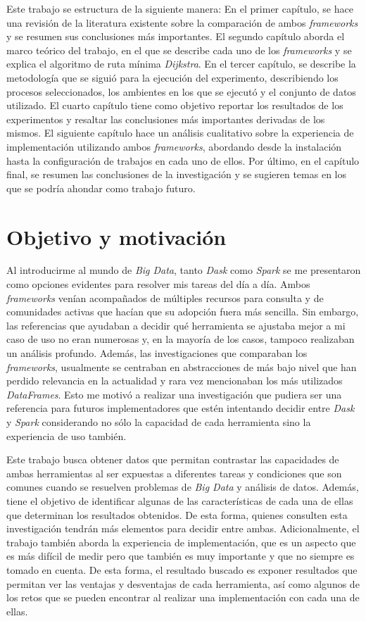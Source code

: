 Este trabajo se estructura de la siguiente manera: En el primer capítulo, se hace una revisión de la literatura existente sobre la comparación de ambos \textit{frameworks} y se resumen sus conclusiones más importantes. El segundo capítulo aborda el marco teórico del trabajo, en el que se describe cada uno de los \textit{frameworks} y se explica el algoritmo de ruta mínima \textit{Dijkstra}. En el tercer capítulo, se describe la metodología que se siguió para la ejecución del experimento, describiendo los procesos seleccionados, los ambientes en los que se ejecutó y el conjunto de datos utilizado. El cuarto capítulo tiene como objetivo reportar los resultados de los experimentos y resaltar las conclusiones más importantes derivadas de los mismos. El siguiente capítulo hace un análisis cualitativo sobre la experiencia de implementación utilizando ambos \textit{frameworks}, abordando desde la instalación hasta la configuración de trabajos en cada uno de ellos. Por último, en el capítulo final, se resumen las conclusiones de la investigación y se sugieren temas en los que se podría ahondar como trabajo futuro.

\section*{Objetivo y motivación}

\noindent Al introducirme al mundo de \textit{Big Data}, tanto \textit{Dask} como \textit{Spark} se me presentaron como opciones evidentes para resolver mis tareas del día a día. Ambos \textit{frameworks} venían acompañados de múltiples recursos para consulta y de comunidades activas que hacían que su adopción fuera más sencilla. Sin embargo, las referencias que ayudaban a decidir qué herramienta se ajustaba mejor a mi caso de uso no eran numerosas y, en la mayoría de los casos, tampoco realizaban un análisis profundo. Además, las investigaciones que comparaban los \textit{frameworks}, usualmente se centraban en abstracciones de más bajo nivel que han perdido relevancia en la actualidad y rara vez mencionaban los más utilizados \textit{DataFrames}. Esto me motivó a realizar una investigación que pudiera ser una referencia para futuros implementadores que estén intentando decidir entre \textit{Dask} y \textit{Spark} considerando no sólo la capacidad de cada herramienta sino la experiencia de uso también.

Este trabajo busca obtener datos que permitan contrastar las capacidades de ambas herramientas al ser expuestas a diferentes tareas y condiciones que son comunes cuando se resuelven problemas de \textit{Big Data} y análisis de datos. Además, tiene el objetivo de identificar algunas de las características de cada una de ellas que determinan los resultados obtenidos. De esta forma, quienes consulten esta investigación tendrán más elementos para decidir entre ambas. Adicionalmente, el trabajo también aborda la experiencia de implementación, que es un aspecto que es más difícil de medir pero que también es muy importante y que no siempre es tomado en cuenta. De esta forma, el resultado buscado es exponer resultados que permitan ver las ventajas y desventajas de cada herramienta, así como algunos de los retos que se pueden encontrar al realizar una implementación con cada una de ellas.

